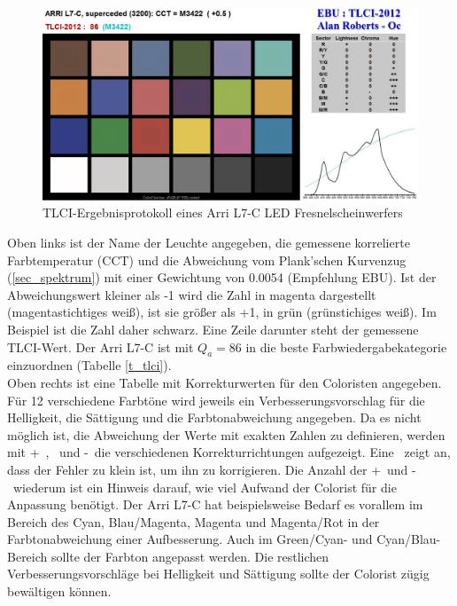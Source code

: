 \begin{figure}[htp]     %
\centering
\includegraphics[width=1.0\textwidth]{bilder/tlci2} 
\caption {TLCI-Ergebnisprotokoll eines Arri L7-C LED Fresnelscheinwerfers\protect\footnotemark}\label{b_tlci2}
\end{figure}
Oben links ist der Name der Leuchte angegeben, die gemessene korrelierte Farbtemperatur (CCT) und die Abweichung vom Plank'schen Kurvenzug (\ref{sec_spektrum}) mit einer Gewichtung von 0.0054 (Empfehlung EBU). Ist der Abweichungswert kleiner als -1 wird die Zahl in magenta dargestellt (magentastichtiges weiß), ist sie größer als +1, in grün (grünstichiges weiß). Im Beispiel ist die Zahl daher schwarz. Eine Zeile darunter steht der gemessene TLCI-Wert. Der Arri L7-C ist mit $Q_{a}=86$ in die beste Farbwiedergabekategorie einzuordnen (Tabelle \ref{t_tlci}).\\
Oben rechts ist eine Tabelle mit Korrekturwerten für den Coloristen angegeben. Für 12 verschiedene Farbtöne wird jeweils ein Verbesserungsvorschlag für die Helligkeit, die Sättigung und die Farbtonabweichung angegeben. Da es nicht möglich ist, die Abweichung der Werte mit exakten Zahlen zu definieren, werden mit \glqq +\grqq\ , \grqq\ und \glqq -\grqq\ die verschiedenen Korrekturrichtungen aufgezeigt. Eine \grqq\ zeigt an, dass der Fehler zu klein ist, um ihn zu korrigieren. Die Anzahl der \glqq +\grqq\ und \glqq -\grqq\ wiederum ist ein Hinweis darauf, wie viel Aufwand der Colorist für die Anpassung benötigt. Der Arri L7-C hat beispielsweise Bedarf es vorallem im Bereich des Cyan, Blau/Magenta, Magenta und Magenta/Rot in der Farbtonabweichung einer Aufbesserung. Auch im Green/Cyan- und Cyan/Blau-Bereich sollte der Farbton angepasst werden. Die restlichen Verbesserungsvorschläge bei Helligkeit und Sättigung sollte der Colorist zügig bewältigen können.\\
